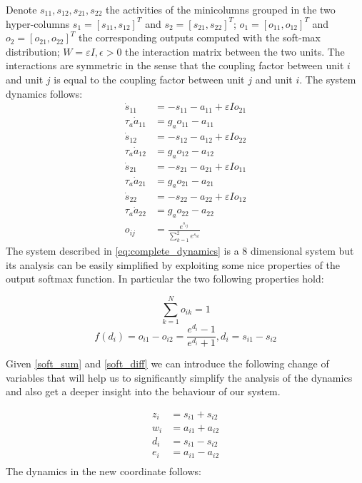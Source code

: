 Denote $s_{11}, s_{12}, s_{21}, s_{22}$ the activities of the minicolumns grouped in the two hyper-columns $s_1 = [s_{11}, s_{12}]^T$ and $s_2 = [s_{21}, s_{22}]^T$;  $o_1 = [o_{11}, o_{12}]^T$ and $o_2 = [o_{21}, o_{22}]^T$ the corresponding outputs computed with the soft-max distribution; $W=\varepsilon I, \epsilon>0$ the interaction matrix between the two units. The interactions are symmetric in the sense that the coupling factor between unit $i$ and unit $j$ is equal to the coupling factor between unit $j$ and unit $i$.  The system dynamics follows:
\begin{equation}
\begin{aligned}
    \dot{s}_{11}&=-s_{11}-a_{11}+\varepsilon I o_{21} \\
    \tau_a \dot{a}_{11}&=g_a o_{11} - a_{11} \\
    \dot{s}_{12}&=-s_{12}-a_{12}+\varepsilon I o_{22} \\
    \tau_a \dot{a}_{12}&=g_a o_{12} - a_{12} \\
    \dot{s}_{21}&=-s_{21}-a_{21}+\varepsilon I o_{11} \\
    \tau_a \dot{a}_{21}&=g_a o_{21} - a_{21} \\
    \dot{s}_{22}&=-s_{22}-a_{22}+\varepsilon I o_{12} \\
    \tau_a \dot{a}_{22}&=g_a o_{22} - a_{22} \\
    o_{i j}&=\frac{e^{s_{i j}}}{\sum_{k=1}^{2} e^{s_{i k}}}
\end{aligned}
\label{eq:complete_dynamics}
\end{equation}
The system described in \eqref{eq:complete_dynamics} is a 8 dimensional system but its analysis can be easily simplified by exploiting some nice properties of the output softmax function. In particular the two following properties hold: 

\begin{equation}
 \sum_{k=1}^{N} o_{i k}=1
 \label{soft_sum}
\end{equation}
\begin{equation}
 f(d_i)= o_{i1}-o_{i2}=\frac{e^{d_i}-1}{e^{d_i}+1}, d_i = s_{i1}-s_{i2}
 \label{soft_diff}
\end{equation}

Given \eqref{soft_sum} and \eqref{soft_diff} we can introduce the following change of variables that will help us to significantly simplify the analysis of the dynamics and also get a deeper insight into the behaviour of our system. 

\begin{equation}
\begin{aligned}
z_i &= s_{i1} + s_{i2} \\
w_i &= a_{i1} + a_{i2} \\
d_i &= s_{i1} - s_{i2} \\
e_i &= a_{i1} - a_{i2} \\
\end{aligned}
\end{equation}
The dynamics in the new coordinate follows:

